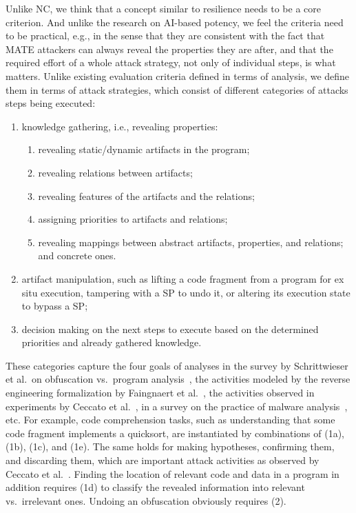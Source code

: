 Unlike NC, we think that a concept similar to resilience needs to be a core criterion. And unlike the research on AI-based potency, we feel the criteria need to be practical, e.g., in the sense that they are consistent with the fact that MATE attackers can always reveal the properties they are after, and that the required effort of a whole attack strategy, not only of individual steps, is what matters. Unlike existing evaluation criteria defined in terms of analysis, we define them in terms of attack strategies, which consist of different categories of attacks steps being executed: 
\begin{enumerate}
\item knowledge gathering, i.e., revealing properties:
\begin{enumerate}
    \item revealing static/dynamic artifacts in the program;
    \item revealing relations between artifacts;
    \item revealing features of the artifacts and the relations;
    \item assigning priorities to artifacts and relations; 
    \item revealing mappings between abstract artifacts, properties, and relations; and concrete ones.
\end{enumerate}
\item artifact manipulation, such as lifting a code fragment from a program for ex situ execution, tampering with a SP to undo it, or altering its execution state to bypass a SP; 
\item decision making on the next steps to execute based on the determined priorities and already gathered knowledge.
\end{enumerate}
These categories capture the four goals of analyses in the survey by Schrittwieser et al.\ on obfuscation vs.\ program analysis~\cite{survey2016}, the activities modeled by the reverse engineering formalization by Faingnaert et al.~\cite{checkmate24}, the activities observed in experiments by Ceccato et al.~\cite{emse2019}, in a survey on the practice of malware analysis~\cite{wong2021inside}, etc. For example, code comprehension tasks, such as understanding that some code fragment implements a quicksort, are instantiated by combinations of (1a), (1b), (1c), and (1e). The same holds for making hypotheses, confirming them, and discarding them, which are important attack activities as observed by Ceccato et al.~\cite{emse2019}. Finding the location of relevant code and data in a program in addition requires (1d) to classify the revealed information into relevant vs.\ irrelevant ones. Undoing an obfuscation obviously requires (2). 

